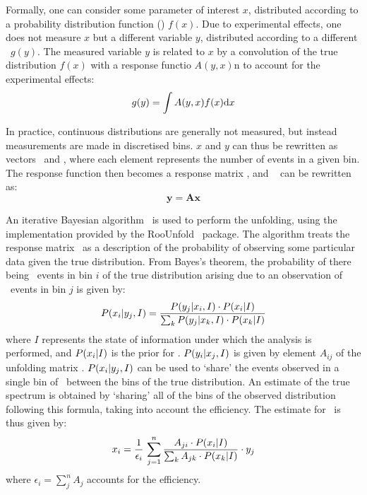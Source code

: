 Formally, one can consider some parameter of interest $x$,
distributed according to a probability distribution function (\probDF) $f(x)$. Due to experimental effects, one
does not measure $x$ but a different variable $y$, distributed
according to a different \probDF\ $g(y)$. The measured variable $y$ is related to $x$ by a
convolution of the true distribution $f(x)$ with a response functio $A(y,x)$n to account for the
experimental effects:
\begin{equation}
g(y) = \int A(y,x)f(x){\rm d}x 
\label{eqn:unfold-conv}
\end{equation}

In practice, continuous distributions are generally not measured, but instead
measurements are made
in discretised bins. $x$ and $y$ can thus be rewritten as
vectors \unfx\ and \unfy, where each element represents the number of events in
a given bin. The response
function then becomes a response matrix \unfA, and ~ can be
rewritten as:
\begin{equation}
\mathbf{y} = \mathbf{Ax} 
\label{eqn:unfold-conv-matrix}
\end{equation}

An iterative Bayesian algorithm~\cite{2010arXiv1010.0632D} is used to perform
the unfolding, 
using the implementation provided by the {\sc
RooUnfold}~\cite{2011arXiv1105.1160A} package. The algorithm treats the response
matrix \unfA\ as a description of the probability of observing some particular data given the
true distribution. From Bayes's theorem, the probability of there being 
\unfxi\ events in bin $i$ of the true distribution arising due to
an observation of \unfyj\ events in bin $j$ is given by:
\begin{equation}
P(x_i|y_j,I) = \frac{P(y_j|x_i,I)\cdot P(x_i|I)}{\sum_{k}P(y_j|x_k,I)\cdot P(x_k|I)}
\end{equation}
where $I$ represents the state of information under which the analysis is
performed, and $P(x_i|I)$ is the prior for \unfxi. $P(y_i|x_j,I)$ is
given by element $A_{ij}$ of the unfolding matrix \unfA. $P(x_i|y_j,I)$
can be used to `share' the events observed in a single bin of \unfy\ between the bins of the
true distribution. An estimate of the true spectrum is obtained by 
`sharing' all of the bins of the observed distribution following this formula, taking into
account the efficiency. The estimate for \unfxi\ is thus given by:
\begin{equation}
x_i = \frac{1}{\epsilon_{i}} \, \sum^{n}_{j=1} \frac{A_{ji} \cdot
P(x_i|I)}{\sum_{k} A_{jk} \cdot P(x_k|I)} \cdot y_j
\end{equation}
where $\epsilon_{i}=\sum^{n}_{j} A_{j}$ accounts for the efficiency.

